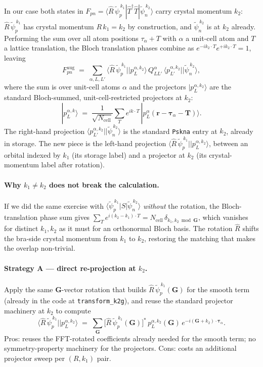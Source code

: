 \documentclass[11pt]{article}
\newcommand{\ket}[1]{| #1 \rangle}
\newcommand{\matel}[3]{\langle #1 | #2 | #3 \rangle}
\newcommand{\rotpsipt}[2]{\hat{R}\,\widetilde{\psi}_{#1}^{\,#2}}
\newcommand{\psipt}[2]{\widetilde{\psi}_{#1}^{\,#2}}
\begin{document}
In our case both states in
$F_{pn} = \matel{\rotpsipt{p}{k_1}}{\widehat{T}^{\dagger}\widehat{T}}{\psipt{n}{k_2}}$
carry crystal momentum $k_2$: $\rotpsipt{p}{k_1}$ has crystal
momentum $R\,k_1 = k_2$ by construction, and $\psipt{n}{k_2}$ is at
$k_2$ already. Performing the sum over all atom positions
$\tau_\alpha + T$ with $\alpha$ a unit-cell atom and $T$ a lattice
translation, the Bloch translation phases combine as
$e^{-i k_2 \cdot T} e^{+i k_2 \cdot T} = 1$, leaving
\begin{equation}
  F_{pn}^{\mathrm{aug}}
  \;=\; \sum_{\alpha, L, L'}
        \matel{\rotpsipt{p}{k_1}}{}{p_L^{\alpha, k_2}}\,
        Q^{\alpha}_{LL'}\,
        \matel{p_{L'}^{\alpha, k_2}}{}{\psipt{n}{k_2}},
  \label{eq:F-aug-explicit}
\end{equation}
where the sum is over unit-cell atoms $\alpha$ and the projectors
$\ket{p_L^{\alpha, k_2}}$ are the standard Bloch-summed,
unit-cell-restricted projectors at $k_2$:
\begin{equation}
  \ket{p_L^{\alpha, k}}
  \;=\; \frac{1}{\sqrt{N_{\mathrm{cell}}}}
        \sum_{T} e^{i k \cdot T}\,
        \ket{p_L^{\alpha}(\mathbf{r}-\boldsymbol{\tau}_\alpha-\mathbf{T})}.
\end{equation}
The right-hand projection
$\matel{p_{L'}^{\alpha, k_2}}{}{\psipt{n}{k_2}}$ is the standard
\texttt{Pskna} entry at $k_2$, already in storage. The new piece is
the left-hand projection
$\matel{\rotpsipt{p}{k_1}}{}{p_L^{\alpha, k_2}}$, between an orbital
indexed by $k_1$ (its storage label) and a projector at $k_2$ (its
crystal-momentum label after rotation).

\paragraph{Why $k_1 \neq k_2$ does not break the calculation.}
If we did the same exercise with $\matel{\psipt{p}{k_1}}{S}{\psipt{n}{k_2}}$
\emph{without} the rotation, the Bloch-translation phase sum gives
$\sum_T e^{i (k_2 - k_1)\cdot T} = N_{\mathrm{cell}}\,\delta_{k_1, k_2 \bmod \mathbf{G}}$,
which vanishes for distinct $k_1, k_2$ as it must for an orthonormal
Bloch basis. The rotation $\hat{R}$ shifts the bra-side crystal
momentum from $k_1$ to $k_2$, restoring the matching that makes the
overlap non-trivial.

\paragraph{Strategy A --- direct re-projection at $k_2$.}
Apply the same $\mathbf{G}$-vector rotation that builds
$\rotpsipt{p}{k_1}(\mathbf{G})$ for the smooth term (already in the
code at \texttt{transform\_k2g}), and reuse the standard projector
machinery at $k_2$ to compute
\begin{equation}
  \matel{\rotpsipt{p}{k_1}}{}{p_L^{\alpha, k_2}}
  \;=\; \sum_{\mathbf{G}} \big[\rotpsipt{p}{k_1}(\mathbf{G})\big]^{*}\,
        p_L^{\alpha, k_2}(\mathbf{G})\, e^{-i (\mathbf{G}+k_2)\cdot \boldsymbol{\tau}_\alpha}.
\end{equation}
Pros: reuses the FFT-rotated coefficients already needed for the
smooth term; no symmetry-property machinery for the projectors. Cons:
costs an additional projector sweep per $(R, k_1)$ pair.
\end{document}
